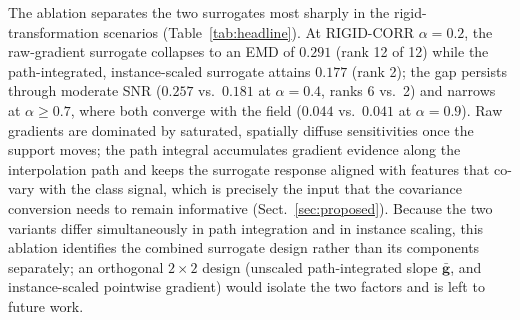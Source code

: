 \documentclass[pdflatex,sn-mathphys-num]{sn-jnl}
\theoremstyle{thmstyleone}
\theoremstyle{thmstyletwo}%
\theoremstyle{thmstylethree}%
\begin{document}
The ablation separates the two surrogates most sharply in the rigid-transformation scenarios (Table~\ref{tab:headline}). At RIGID-CORR $\alpha = 0.2$, the raw-gradient surrogate collapses to an EMD of $0.291$ (rank 12 of 12) while the path-integrated, instance-scaled surrogate attains $0.177$ (rank 2); the gap persists through moderate SNR ($0.257$ vs.\ $0.181$ at $\alpha = 0.4$, ranks 6 vs.\ 2) and narrows at $\alpha \ge 0.7$, where both converge with the field ($0.044$ vs.\ $0.041$ at $\alpha = 0.9$). Raw gradients are dominated by saturated, spatially diffuse sensitivities once the support moves; the path integral accumulates gradient evidence along the interpolation path and keeps the surrogate response aligned with features that co-vary with the class signal, which is precisely the input that the covariance conversion needs to remain informative (Sect.~\ref{sec:proposed}). Because the two variants differ simultaneously in path integration and in instance scaling, this ablation identifies the combined surrogate design rather than its components separately; an orthogonal $2 \times 2$ design (unscaled path-integrated slope $\bar{\mathbf{g}}$, and instance-scaled pointwise gradient) would isolate the two factors and is left to future work.
\end{document}
